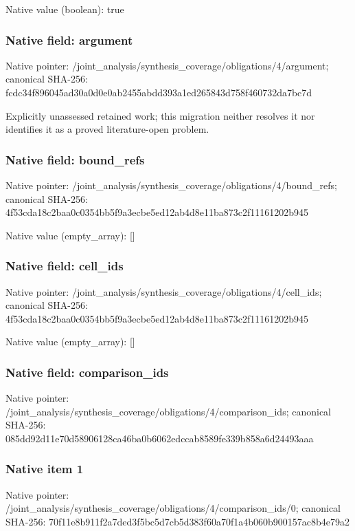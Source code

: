 \documentclass[10pt,a4paper]{article}
\begin{document}
Native value (boolean): true

\subsubsection{Native field: argument}
Native pointer: /joint\_\allowbreak{}analysis/synthesis\_\allowbreak{}coverage/obligations/4/argument; canonical SHA-256: fcdc34f896045ad30a0d0e0ab2455abdd393a1ed265843d758f460732da7bc7d

\begingroup\raggedright\sloppy Explicitly unassessed retained work;\allowbreak{} this migration neither resolves it nor identifies it as a proved literature-open problem.\par\endgroup

\subsubsection{Native field: bound\_\allowbreak{}refs}
Native pointer: /joint\_\allowbreak{}analysis/synthesis\_\allowbreak{}coverage/obligations/4/bound\_\allowbreak{}refs; canonical SHA-256: 4f53cda18c2baa0c0354bb5f9a3ecbe5ed12ab4d8e11ba873c2f11161202b945

Native value (empty\_\allowbreak{}array): []

\subsubsection{Native field: cell\_\allowbreak{}ids}
Native pointer: /joint\_\allowbreak{}analysis/synthesis\_\allowbreak{}coverage/obligations/4/cell\_\allowbreak{}ids; canonical SHA-256: 4f53cda18c2baa0c0354bb5f9a3ecbe5ed12ab4d8e11ba873c2f11161202b945

Native value (empty\_\allowbreak{}array): []

\subsubsection{Native field: comparison\_\allowbreak{}ids}
Native pointer: /joint\_\allowbreak{}analysis/synthesis\_\allowbreak{}coverage/obligations/4/comparison\_\allowbreak{}ids; canonical SHA-256: 085dd92d11e70d58906128ca46ba0b6062edccab8589fe339b858a6d24493aaa

\subsubsection{Native item 1}
Native pointer: /joint\_\allowbreak{}analysis/synthesis\_\allowbreak{}coverage/obligations/4/comparison\_\allowbreak{}ids/0; canonical SHA-256: 70f11e8b911f2a7ded3f5bc5d7cb5d383f60a70f1a4b060b900157ac8b4e79a2
\end{document}
